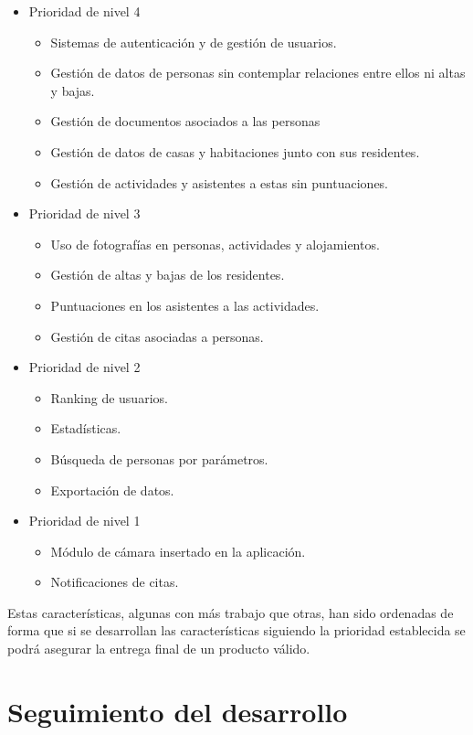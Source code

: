 \begin{itemize}
    \item Prioridad de nivel 4
    \begin{itemize}
        \item Sistemas de autenticación y de gestión de usuarios.
        \item Gestión de datos de personas sin contemplar relaciones entre ellos ni altas y bajas.
        \item Gestión de documentos asociados a las personas
        \item Gestión de datos de casas y habitaciones junto con sus residentes.
        \item Gestión de actividades y asistentes a estas sin puntuaciones.
    \end{itemize}
    \item Prioridad de nivel 3
    \begin{itemize}
        \item Uso de fotografías en personas, actividades y alojamientos.
        \item Gestión de altas y bajas de los residentes.
        \item Puntuaciones en los asistentes a las actividades.
        \item Gestión de citas asociadas a personas.
    \end{itemize}
    \item Prioridad de nivel 2
    \begin{itemize}
        \item Ranking de usuarios.
        \item Estadísticas.
        \item Búsqueda de personas por parámetros.
        \item Exportación de datos.
    \end{itemize}
    \item Prioridad de nivel 1
    \begin{itemize}
        \item Módulo de cámara insertado en la aplicación.
        \item Notificaciones de citas. 
    \end{itemize}
\end{itemize}

Estas características, algunas con más trabajo que otras, han sido ordenadas de forma que si se desarrollan las características siguiendo la prioridad establecida se podrá asegurar la entrega final de un producto válido.

\section{Seguimiento del desarrollo}
